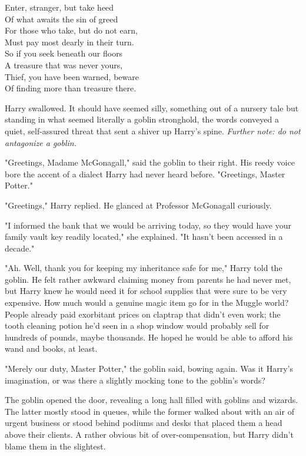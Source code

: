 \begin{inscription}
Enter, stranger, but take heed\\
Of what awaits the sin of greed\\
For those who take, but do not earn,\\
Must pay most dearly in their turn.\\
So if you seek beneath our floors\\
A treasure that was never yours,\\
Thief, you have been warned, beware\\
Of finding more than treasure there.
\end{inscription}

Harry swallowed. It should have seemed silly, something
out of a nursery tale{\el} but standing in what seemed
literally a goblin stronghold, the words conveyed a quiet,
self-assured threat that sent a shiver up Harry's spine.
\emph{Further note: do not antagonize a goblin.}

"Greetings, Madame McGonagall," said the goblin to their
right. His reedy voice bore the accent of a dialect
Harry had never heard before. "Greetings, Master Potter."

"Greetings," Harry replied. He glanced at Professor McGonagall curiously.

"I informed the bank that we would be arriving today, so
they would have your family vault key readily located," she
explained. "It hasn't been accessed in a decade."

"Ah. Well, thank you for keeping my inheritance safe for
me," Harry told the goblin. He felt rather awkward claiming
money from parents he had never met, but Harry knew he
would need it for school supplies that were sure to be
very expensive. How much would a genuine magic item go
for in the Muggle world? People already paid exorbitant
prices on claptrap that didn't even work; the tooth cleaning
potion he'd seen in a shop window would probably sell for
hundreds of pounds, maybe thousands. He hoped he
would be able to afford his wand and books, at least.

"Merely our duty, Master Potter," the goblin said,
bowing again. Was it Harry's imagination, or was there a
slightly mocking tone to the goblin's words?

The goblin opened the door, revealing a long hall filled with
goblins and wizards. The latter mostly stood in queues,
while the former walked about with an air of urgent
business or stood behind podiums and desks that placed
them a head above their clients. A rather obvious bit of
over-compensation, but Harry didn't blame them in the slightest.

